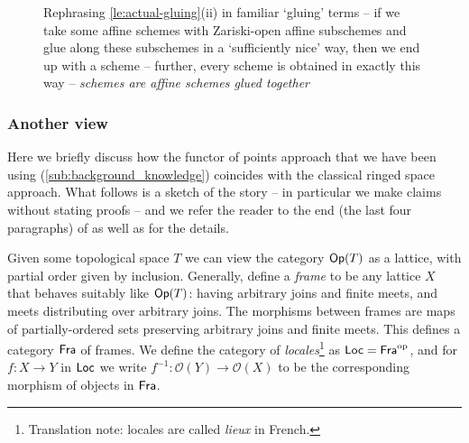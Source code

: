         \begin{figure}[h!]
            \centering
            \caption{Rephrasing \cref{le:actual-gluing}(ii) in familiar `gluing' terms -- if we take some affine schemes with Zariski-open affine subschemes and glue along these subschemes in a `sufficiently nice' way, then we end up with a scheme -- further, every scheme is obtained in exactly this way -- \emph{schemes are affine schemes glued together}}\label{fg:gluing}
        \end{figure}






    \subsubsection{Another view} %
    \label{ssub:another_view}

        Here we briefly discuss how the functor of points approach that we have been using (\cref{sub:background_knowledge}) coincides with the classical ringed space approach.
        What follows is a sketch of the story -- in particular we make claims without stating proofs -- and we refer the reader to the end (the last four paragraphs) of \cite[\S2.4, p.24]{Toen:2005wxa} as well as \cite[\S IX.1--3]{MacLane:1992uz} for the details.

        \bigskip

        Given some topological space $T$ we can view the category $\mathsf{Op}(T)$ as a lattice, with partial order given by inclusion.
        Generally, define a \emph{frame} to be any lattice $X$ that behaves suitably like $\mathsf{Op}(T)$: having arbitrary joins and finite meets, and meets distributing over arbitrary joins.
        The morphisms between frames are maps of partially-ordered sets preserving arbitrary joins and finite meets.
        This defines a category $\mathsf{Fra}$ of frames.
        We define the category of \emph{locales}\footnote{
            Translation note: locales are called \emph{lieux} in French.
        } as $\mathsf{Loc}={\mathsf{Fra}}^{\mathrm{op}}$, and for $f\colon X\to Y$ in $\mathsf{Loc}$ we write $f^{-1}\colon\mathcal{O}(Y)\to\mathcal{O}(X)$ to be the corresponding morphism of objects in $\mathsf{Fra}$.

